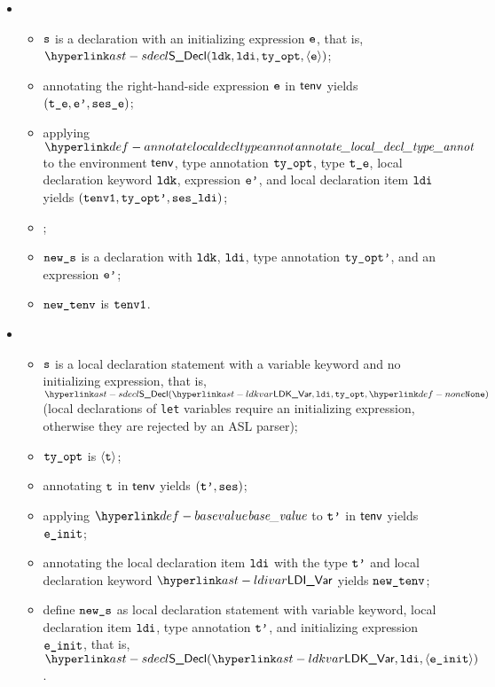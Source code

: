 \ProseParagraph
\OneApplies
\begin{itemize}
  \item {}
  \begin{itemize}
    \item $\texttt{s}$ is a declaration with an initializing expression $\texttt{e}$,
          that is, \\
          $\SDecl(\ldk, \ldi, \tyopt, \langle\ve\rangle)$;
    \item annotating the right-hand-side expression $\texttt{e}$ in $\textsf{tenv}$ yields $(\texttt{t\_e},\texttt{e'}, \texttt{ses\_e})$\ProseOrTypeError;
    \item applying $\annotatelocaldecltypeannot$ to the environment $\textsf{tenv}$, type annotation $\texttt{ty\_opt}$, type $\texttt{t\_e}$, local declaration keyword $\texttt{ldk}$, expression $\texttt{e'}$, and local declaration item $\texttt{ldi}$ yields $(\texttt{tenv1}, \texttt{ty\_opt'}, \texttt{ses\_ldi})$\ProseOrTypeError;
    \item {};
    \item $\texttt{new\_s}$ is a declaration with $\texttt{ldk}$, $\texttt{ldi}$, type annotation $\texttt{ty\_opt'}$, and an expression $\texttt{e'}$;
    \item $\texttt{new\_tenv}$ is $\texttt{tenv1}$.
  \end{itemize}

  \item {}
  \begin{itemize}
  \item $\texttt{s}$ is a local declaration statement with a variable keyword and no initializing expression,
        that is, $\SDecl(\LDKVar, \ldi, \tyopt, \None)$ (local declarations of \texttt{let} variables require
        an initializing expression, otherwise they are rejected by an ASL parser);
  \item $\texttt{ty\_opt}$ is $\langle\texttt{t}\rangle$\ProseOrTypeError;
  \item annotating $\texttt{t}$ in $\textsf{tenv}$ yields $(\texttt{t'}, \texttt{ses})$\ProseOrTypeError;
  \item applying $\basevalue$ to $\texttt{t'}$ in $\textsf{tenv}$ yields $\texttt{e\_init}$\ProseOrTypeError;
  \item annotating the local declaration item $\texttt{ldi}$ with the type $\texttt{t'}$ and local declaration keyword $\LDIVar$
        yields $\texttt{new\_tenv}$\ProseOrTypeError;
  \item define $\texttt{new\_s}$ as local declaration statement with variable keyword, local declaration item $\texttt{ldi}$, type annotation $\texttt{t'}$, and initializing expression $\texttt{e\_init}$, that is, $\SDecl(\LDKVar, \ldi, \langle\veinit\rangle)$.
  \end{itemize}
\end{itemize}

